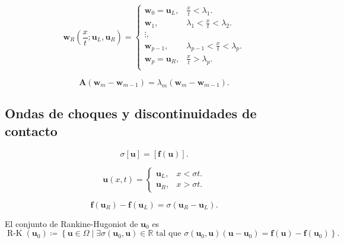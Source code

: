 \begin{equation*}
	\symbf{w}_{R}\left(\frac{x}{t};\symbf{u}_{L},\symbf{u}_{R}\right)=
	\begin{cases}
		\symbf{w}_{0}=\symbf{u}_{L}, & \frac{x}{t}<\lambda_{1}.               \\
		\symbf{w}_{1},               & \lambda_{1}<\frac{x}{t}<\lambda_{2}.   \\
		\vdots,                      &                                        \\
		\symbf{w}_{p-1},             & \lambda_{p-1}<\frac{x}{t}<\lambda_{p}. \\
		\symbf{w}_{p}=\symbf{u}_{R}, & \frac{x}{t}>\lambda_{p}.               \\
	\end{cases}
\end{equation*}

\begin{equation*}
	\symbf{A}\left(\symbf{w}_{m}-\symbf{w}_{m-1}\right)=
	\lambda_{m}\left(\symbf{w}_{m}-\symbf{w}_{m-1}\right).
\end{equation*}

\subsection{Ondas de choques y discontinuidades de contacto}

\begin{equation*}
	\sigma\left[\symbf{u}\right]=
	\left[\symbf{f}\left(\symbf{u}\right)\right].
\end{equation*}


\begin{equation*}
	\symbf{u}\left(x,t\right)=
	\begin{cases}
		\symbf{u}_{L}, & x<\sigma t. \\
		\symbf{u}_{R}, & x>\sigma t.
	\end{cases}
\end{equation*}

\begin{equation*}
	\symbf{f}\left(\symbf{u}_{R}\right)-
	\symbf{f}\left(\symbf{u}_{L}\right)=
	\sigma
	\left(\symbf{u}_{R}-\symbf{u}_{L}\right).
\end{equation*}

\begin{definition}
	El conjunto de Rankine-Hugoniot de $\symbf{u}_{0}$ es
	\begin{equation*}
		\operatorname{R-K}\left(\symbf{u}_{0}\right)\coloneqq
		\left\{
		\symbf{u}\in\Omega\mid\exists\sigma\left(\symbf{u}_{0},\symbf{u}\right)\in\mathbb{R}\text{ tal que }
		\sigma\left(\symbf{u}_{0},\symbf{u}\right)\left(\symbf{u}-\symbf{u}_{0}\right)=
		\symbf{f}\left(\symbf{u}\right)-\symbf{f}\left(\symbf{u}_{0}\right)
		\right\}.
	\end{equation*}
\end{definition}

